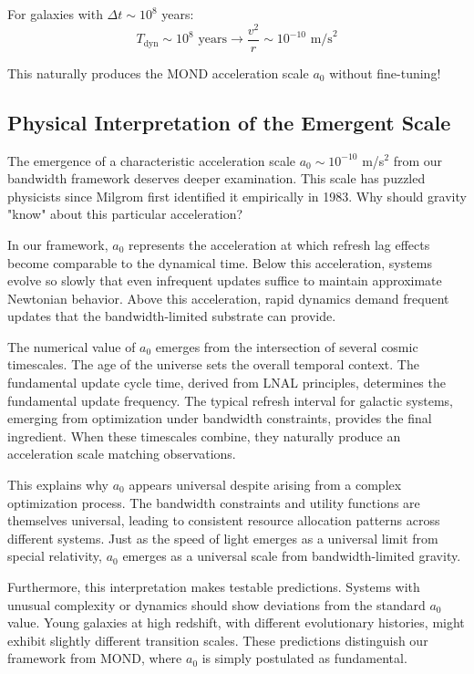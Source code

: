 \documentclass[twocolumn,prd,amsmath,amssymb,aps,superscriptaddress,nofootinbib]{revtex4-2}
\begin{document}
For galaxies with $\Delta t \sim 10^8$ years:
\begin{equation}
T_{\text{dyn}} \sim 10^8 \text{ years} \rightarrow \frac{v^2}{r} \sim 10^{-10} \text{ m/s}^2
\end{equation}

This naturally produces the MOND acceleration scale $a_0$ without fine-tuning!

\subsection{Physical Interpretation of the Emergent Scale}

The emergence of a characteristic acceleration scale $a_0 \sim 10^{-10}$ m/s$^2$ from our bandwidth framework deserves deeper examination. This scale has puzzled physicists since Milgrom first identified it empirically in 1983. Why should gravity "know" about this particular acceleration?

In our framework, $a_0$ represents the acceleration at which refresh lag effects become comparable to the dynamical time. Below this acceleration, systems evolve so slowly that even infrequent updates suffice to maintain approximate Newtonian behavior. Above this acceleration, rapid dynamics demand frequent updates that the bandwidth-limited substrate can provide.

The numerical value of $a_0$ emerges from the intersection of several cosmic timescales. The age of the universe sets the overall temporal context. The fundamental update cycle time, derived from LNAL principles, determines the fundamental update frequency. The typical refresh interval for galactic systems, emerging from optimization under bandwidth constraints, provides the final ingredient. When these timescales combine, they naturally produce an acceleration scale matching observations.

This explains why $a_0$ appears universal despite arising from a complex optimization process. The bandwidth constraints and utility functions are themselves universal, leading to consistent resource allocation patterns across different systems. Just as the speed of light emerges as a universal limit from special relativity, $a_0$ emerges as a universal scale from bandwidth-limited gravity.

Furthermore, this interpretation makes testable predictions. Systems with unusual complexity or dynamics should show deviations from the standard $a_0$ value. Young galaxies at high redshift, with different evolutionary histories, might exhibit slightly different transition scales. These predictions distinguish our framework from MOND, where $a_0$ is simply postulated as fundamental.
\end{document}
